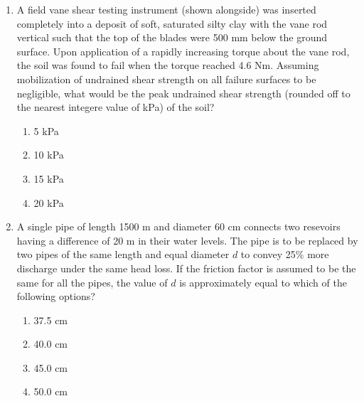 \documentclass[journal,12pt,onecolumn]{IEEEtran}
\theoremstyle{remark}
\begin{document}
\begin{enumerate}
\item A field vane shear testing instrument (shown alongside) was inserted completely into a deposit of soft, saturated silty clay with the vane rod vertical such that the top of the blades were 500 mm below the ground surface. Upon application of a rapidly increasing torque about the vane rod, the soil was found to fail when the torque reached 4.6 Nm. Assuming mobilization of undrained shear strength on all failure surfaces to be negligible, what would be the peak undrained shear strength (rounded off to the nearest integere value of kPa) of the soil?
\begin{figure}[ht]
\centering

\end{figure}
	\begin{multicols}{4}
	\begin{enumerate}
		\item 5 kPa
		\item 10 kPa
		\item 15 kPa
		\item 20 kPa
	\end{enumerate}
	\end{multicols}
\newpage
\item A single pipe of length 1500 m and diameter 60 cm connects two resevoirs having a difference of 20 m in their water levels. The pipe is to be replaced by two pipes of the same length and equal diameter $d$ to convey 25\% more discharge under the same head loss. If the friction factor is assumed to be the same for all the pipes, the value of $d$ is approximately equal to which of the following options?
	\begin{multicols}{4}
	\begin{enumerate}
		\item 37.5 cm
		\item 40.0 cm
		\item 45.0 cm
		\item 50.0 cm
	\end{enumerate}
	\end{multicols}

\end{enumerate}
\end{document}
